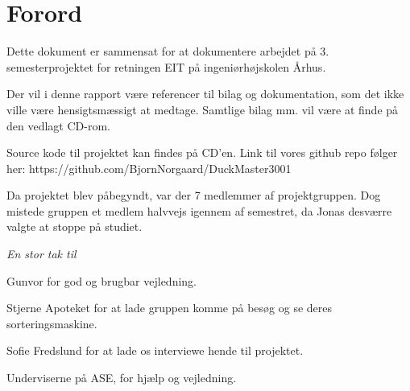 \chapter{Forord}


Dette dokument er sammensat for at dokumentere arbejdet på 3. semesterprojektet for retningen EIT på ingeniørhøjskolen Århus.

Der vil i denne rapport være referencer til bilag og dokumentation, som det ikke ville være hensigtsmæssigt at medtage. Samtlige bilag mm. vil være at finde på den vedlagt CD-rom. 

Source kode til projektet kan findes på CD'en. Link til vores github repo følger her: https://github.com/BjornNorgaard/DuckMaster3001

Da projektet blev påbegyndt, var der 7 medlemmer af projektgruppen. Dog mistede gruppen et medlem halvvejs igennem af semestret, da Jonas desværre valgte at stoppe på studiet. 

\vspace{5mm}

\large{\textit{En stor tak til}}

\begin{displayquote}
    Gunvor for god og brugbar vejledning.
\end{displayquote}

\begin{displayquote}
    Stjerne Apoteket for at lade gruppen komme på besøg og se deres sorteringsmaskine.
\end{displayquote}

\begin{displayquote}
    Sofie Fredslund for at lade os interviewe hende til projektet.
\end{displayquote}

\begin{displayquote}
   Underviserne på ASE, for hjælp og vejledning.
\end{displayquote}

